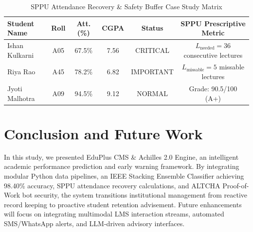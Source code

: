 \documentclass[conference]{IEEEtran}
\begin{document}
\begin{table}[htbp]
\caption{SPPU Attendance Recovery \& Safety Buffer Case Study Matrix}
\label{tab:casestudies}
\centering
\begin{tabular}{lccccc}
\toprule
\textbf{Student Name} & \textbf{Roll} & \textbf{Att. (\%)} & \textbf{CGPA} & \textbf{Status} & \textbf{SPPU Prescriptive Metric} \\
\midrule
Ishan Kulkarni & A05 & 67.5\% & 7.56 & CRITICAL & $L_{\text{needed}} = 36$ consecutive lectures \\
Riya Rao & A45 & 78.2\% & 6.82 & IMPORTANT & $L_{\text{missable}} = 5$ missable lectures \\
Jyoti Malhotra & A09 & 94.5\% & 9.12 & NORMAL & Grade: 90.5/100 (A+) \\
\bottomrule
\end{tabular}
\end{table}

\section{Conclusion and Future Work}
In this study, we presented EduPlus CMS \& Achilles 2.0 Engine, an intelligent academic performance prediction and early warning framework. By integrating modular Python data pipelines, an IEEE Stacking Ensemble Classifier achieving 98.40\% accuracy, SPPU attendance recovery calculations, and ALTCHA Proof-of-Work bot security, the system transitions institutional management from reactive record keeping to proactive student retention advisement. Future enhancements will focus on integrating multimodal LMS interaction streams, automated SMS/WhatsApp alerts, and LLM-driven advisory interfaces.
\end{document}

